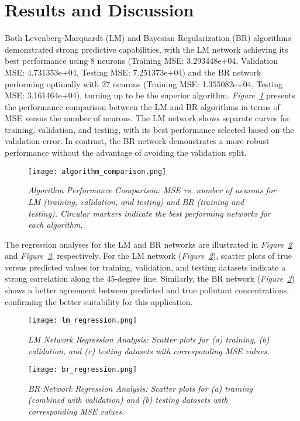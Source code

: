 \documentclass[10pt]{article}
\begin{document}
	\section{Results and Discussion}
	Both Levenberg-Marquardt (LM) and Bayesian Regularization (BR) algorithms demonstrated strong predictive capabilities, with the LM network achieving its best performance using 8 neurons (Training MSE: 3.293448e+04, Validation MSE: 4.731353e+04, Testing MSE: 7.251373e+04) and the BR network performing optimally with 27 neurons (Training MSE: 1.355082e+04, Testing MSE: 3.161464e+04), turning up to be the superior algorithm.
	\textit{Figure~\ref{fig:comparison}} presents the performance comparison between the LM and BR algorithms in terms of MSE versus the number of neurons. The LM network shows separate curves for training, validation, and testing, with its best performance selected based on the validation error. In contrast, the BR network demonstrates a more robust performance without the advantage of avoiding the validation split.
	\begin{figure}[H]
		\centering
		\texttt{[image: algorithm\_comparison.png]}
		\caption{\textit{Algorithm Performance Comparison: MSE vs. number of neurons for LM (training, validation, and testing) and BR (training and testing). Circular markers indicate the best performing networks for each algorithm.}}
		\label{fig:comparison}
	\end{figure}
	The regression analyses for the LM and BR networks are illustrated in \textit{Figure~\ref{fig:lm_reg}} and \textit{Figure~\ref{fig:br_reg}}, respectively. For the LM network (\textit{Figure~\ref{fig:lm_reg}}), scatter plots of true versus predicted values for training, validation, and testing datasets indicate a strong correlation along the 45-degree line. Similarly, the BR network (\textit{Figure~\ref{fig:br_reg}}) shows a better agreement between predicted and true pollutant concentrations, confirming the better suitability for this application.
	\begin{figure}[H]
		\centering
		\texttt{[image: lm\_regression.png]}
		\caption{\textit{LM Network Regression Analysis: Scatter plots for (a) training, (b) validation, and (c) testing datasets with corresponding MSE values.}}
		\label{fig:lm_reg}
	\end{figure}
	\begin{figure}[H]
		\centering
		\texttt{[image: br\_regression.png]}
		\caption{\textit{BR Network Regression Analysis: Scatter plots for (a) training (combined with validation) and (b) testing datasets with corresponding MSE values.}}
		\label{fig:br_reg}
	\end{figure}
\end{document}
